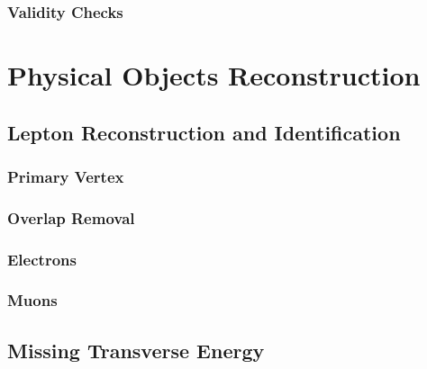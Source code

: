 \documentclass[10pt,twoside,cucitura,classica,english,openany]{toptesi}
\begin{document}


\subsection{Validity Checks}
\label{sec:validity-checks}



\chapter{Physical Objects Reconstruction}
\label{cha:phys-objects-reconst}

\section{Lepton Reconstruction and Identification}
\label{sec:lept-reconstr-ident}



\subsection{Primary Vertex}
\label{sec:primary-vertex}



\subsection{Overlap Removal}
\label{sec:overlap-removal}



\subsection{Electrons}
\label{sec:electrons}



\subsection{Muons}
\label{sec:muons}



\section{Missing Transverse Energy}
\label{sec:miss-transv-energy}


\end{document}

